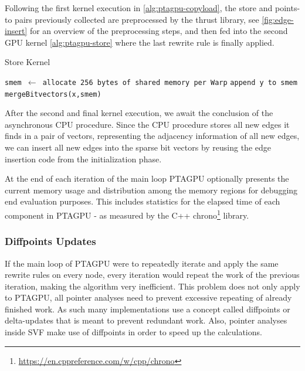 Following the first kernel execution in \autoref{alg:ptagpu-copyload}, the store and points-to pairs previously collected are preprocessed by the thrust library, see \autoref{fig:edge-insert} for an overview of the preprocessing steps, and then fed into the second GPU kernel \autoref{alg:ptagpu-store} where the last rewrite rule is finally applied.
\begin{algorithm}
    \caption[Store Kernel Pseudocode]{Store Kernel}\label{alg:ptagpu-store}
    \begin{algorithmic}
        \State \texttt{smem $\leftarrow$ allocate 256 bytes of shared memory per Warp}
        \State \texttt{append y to smem}
        \EndFor
        \State \texttt{mergeBitvectors(x,smem)} 
        \EndFor
    \end{algorithmic}
\end{algorithm}

After the second and final kernel execution, we await the conclusion of the asynchronous CPU procedure.
Since the CPU procedure stores all new edges it finds in a pair of vectors, representing the adjacency information of all new edges, we can insert all new edges into the sparse bit vectors by reusing the edge insertion code from the initialization phase.

At the end of each iteration of the main loop PTAGPU optionally presents the current memory usage and distribution among the memory regions for debugging end evaluation purposes. This includes statistics for the elapsed time of each component in PTAGPU - as measured by the C++ chrono\footnote{\url{https://en.cppreference.com/w/cpp/chrono}} library.

\subsubsection{Diffpoints Updates}\label{sec:diffpts}
If the main loop of PTAGPU were to repeatedly iterate and apply the same rewrite rules on every node, every iteration would repeat the work of the previous iteration, making the algorithm very inefficient.
This problem does not only apply to PTAGPU, all pointer analyses need to prevent excessive repeating of already finished work.
As such many implementations use a concept called diffpoints or delta-updates that is meant to prevent redundant work. Also, pointer analyses inside SVF make use of diffpoints in order to speed up the calculations.

